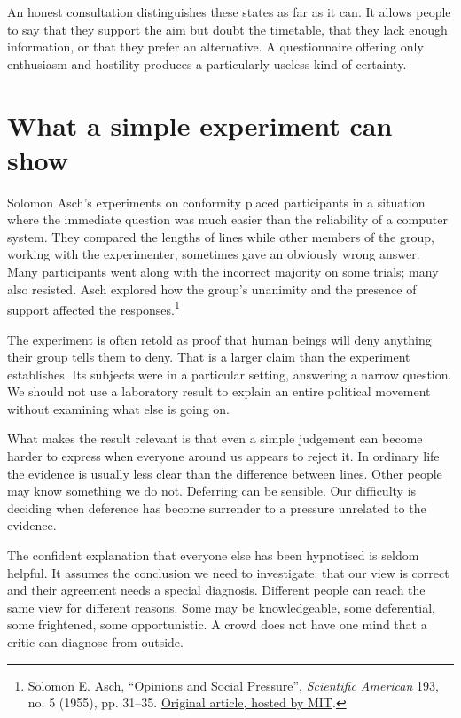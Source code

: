 \documentclass[12pt,a4paper]{book}
\begin{document}
An honest consultation distinguishes these states as far as it can. It allows people to say that they support the aim but doubt the timetable, that they lack enough information, or that they prefer an alternative. A questionnaire offering only enthusiasm and hostility produces a particularly useless kind of certainty.

\section*{What a simple experiment can show}

Solomon Asch's experiments on conformity placed participants in a situation where the immediate question was much easier than the reliability of a computer system. They compared the lengths of lines while other members of the group, working with the experimenter, sometimes gave an obviously wrong answer. Many participants went along with the incorrect majority on some trials; many also resisted. Asch explored how the group's unanimity and the presence of support affected the responses.\footnote{Solomon E. Asch, ``Opinions and Social Pressure'', \emph{Scientific American} 193, no. 5 (1955), pp. 31--35. \href{https://web.mit.edu/curhan/www/docs/Articles/15341_Readings/Influence_Compliance/Asch_1955_Opinions_and_social_pressure.pdf}{Original article, hosted by MIT}.}

The experiment is often retold as proof that human beings will deny anything their group tells them to deny. That is a larger claim than the experiment establishes. Its subjects were in a particular setting, answering a narrow question. We should not use a laboratory result to explain an entire political movement without examining what else is going on.

What makes the result relevant is that even a simple judgement can become harder to express when everyone around us appears to reject it. In ordinary life the evidence is usually less clear than the difference between lines. Other people may know something we do not. Deferring can be sensible. Our difficulty is deciding when deference has become surrender to a pressure unrelated to the evidence.

The confident explanation that everyone else has been hypnotised is seldom helpful. It assumes the conclusion we need to investigate: that our view is correct and their agreement needs a special diagnosis. Different people can reach the same view for different reasons. Some may be knowledgeable, some deferential, some frightened, some opportunistic. A crowd does not have one mind that a critic can diagnose from outside.
\end{document}
